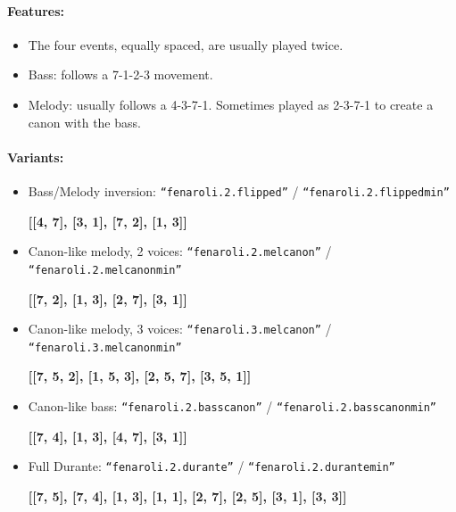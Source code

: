 \documentclass[11pt, openany]{article}
\begin{document}
\paragraph{Features:}
\begin{itemize}
\item The four events, equally spaced, are usually played twice.
\item Bass: follows a 7-1-2-3 movement.
\item Melody: usually follows a 4-3-7-1. Sometimes played as 2-3-7-1 to create a canon with the bass.
\end{itemize}

\paragraph{Variants:}
\begin{itemize}
\item Bass/Melody inversion: \texttt{“fenaroli.2.flipped”} / \texttt{“fenaroli.2.flippedmin”}
	\begin{center}
	\textbf{[[4, 7], [3, 1], [7, 2], [1, 3]]}
	\end{center}
\item Canon-like melody, 2 voices: \texttt{“fenaroli.2.melcanon”} / \texttt{“fenaroli.2.melcanonmin”}
	\begin{center}
	\textbf{[[7, 2], [1, 3], [2, 7], [3, 1]]}
	\end{center}
\item Canon-like melody, 3 voices: \texttt{“fenaroli.3.melcanon”} / \texttt{“fenaroli.3.melcanonmin”}
	\begin{center}
	\textbf{[[7, 5, 2], [1, 5, 3], [2, 5, 7], [3, 5, 1]]}
	\end{center}
\item Canon-like bass: \texttt{“fenaroli.2.basscanon”} / \texttt{“fenaroli.2.basscanonmin”}
	\begin{center}
	\textbf{[[7, 4], [1, 3], [4, 7], [3, 1]]}
	\end{center}
\item Full Durante: \texttt{“fenaroli.2.durante”} / \texttt{“fenaroli.2.durantemin”}
	\begin{center}
	\textbf{[[7, 5], [7, 4], [1, 3], [1, 1], [2, 7], [2, 5], [3, 1], [3, 3]]}
	\end{center}
\end{itemize}
\end{document}
